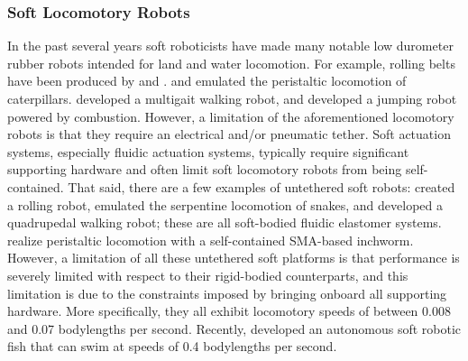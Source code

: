 \subsubsection{Soft Locomotory Robots}
\label{subsubsec:RW Land}
In the past several years soft roboticists have made many notable low durometer rubber robots intended for land and water locomotion.
For example, rolling belts have been produced by \citet{correll2010soft} and \citet{marchese2011soft}.
\citet{trimmer2006caterpillar} and \citet{umedachi2013highly} emulated the peristaltic locomotion of caterpillars. \citet{shepherd2011multigait} developed a multigait walking robot, and \citet{shepherd2013using} developed a jumping robot powered by combustion.
However, a limitation of the aforementioned locomotory robots is that they require an electrical and/or pneumatic tether.
Soft actuation systems, especially fluidic actuation systems, typically require significant supporting hardware and often limit soft locomotory robots from being self-contained.
That said, there are a few examples of untethered soft robots:
\citet{onal2011soft} created a rolling robot, \citet{onal2013autonomous} emulated the serpentine locomotion of snakes, and \cite{tolley2014resilient} developed a quadrupedal walking robot; these are all soft-bodied fluidic elastomer systems.
\citet{seok2010peristaltic} realize peristaltic locomotion with a self-contained SMA-based inchworm.
However, a limitation of all these untethered soft platforms is that performance is severely limited with respect to their rigid-bodied counterparts, and this limitation is due to the constraints imposed by bringing onboard all supporting hardware.
More specifically, they all exhibit locomotory speeds of between 0.008 and 0.07 bodylengths per second.
Recently, \citet{marchese2014autonomous} developed an autonomous soft robotic fish that can swim at speeds of 0.4 bodylengths per second.

